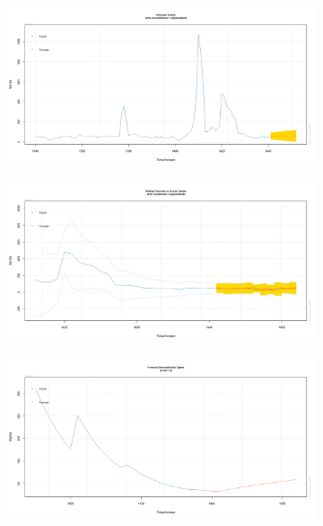 \documentclass[12pt]{article}
\begin{document}
\begin{figure}[H]
  \centering
  \begin{subfigure}[b]{0.6\linewidth}
    \includegraphics[width=\linewidth]{figure28-1.png}
  \end{subfigure}
  \begin{subfigure}[b]{0.6\linewidth}
    \includegraphics[width=\linewidth]{figure28-2.png}
  \end{subfigure}
  \begin{subfigure}[b]{0.6\linewidth}
    \includegraphics[width=\linewidth]{figure28-3.png}
  \end{subfigure}

\end{figure}
\end{document}
